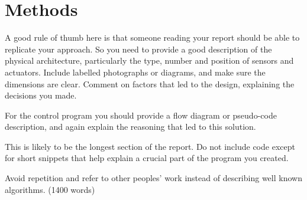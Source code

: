 \section{Methods}

A good rule of thumb here is that someone reading your report should be able to replicate your approach. So you need to provide a good description of the physical architecture, particularly the type, number and position of sensors and actuators. Include labelled photographs or diagrams, and make sure the dimensions are clear. Comment on factors that led to the design, explaining the decisions you made.

For the control program you should provide a flow diagram or pseudo-code description, and again explain the reasoning that led to this solution.

This is likely to be the longest section of the report. Do not include code except for short snippets that help explain a crucial part of the program you created.

Avoid repetition and refer to other peoples' work instead of describing well known algorithms. (1400 words)

\newpage
